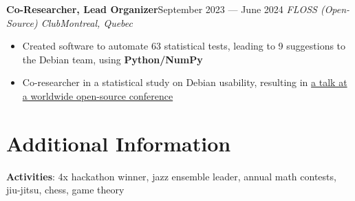\documentclass{article}
\newcommand{\newrole}[4]{
    {\normalfont\textbf{#1}\hfill#3}
    \newline
    \textit{#2}\hfill\textit{#4}
}
\newenvironment{bulletpoints}{\begin{itemize}\setlength\itemsep{-0.2em}}{\end{itemize}}
\begin{document}
\newrole{Co-Researcher, Lead Organizer}{FLOSS (Open-Source) Club}{September 2023 --- June 2024}{Montreal, Quebec}
\begin{bulletpoints}
    \item Created software to automate 63 statistical tests, leading to 9 suggestions to the Debian team, using \textbf{Python/NumPy}
    \item Co-researcher in a statistical study on Debian usability, resulting in \href{https://debconf24.debconf.org/talks/49-debian-installer-usability-tests-take-2/}{a talk at a worldwide open-source conference\;\faExternalLink}
\end{bulletpoints}


\section*{Additional Information}
{\bfseries Activities}: 4x hackathon winner, jazz ensemble leader, annual math contests, jiu-jitsu, chess, game theory
\end{document}
